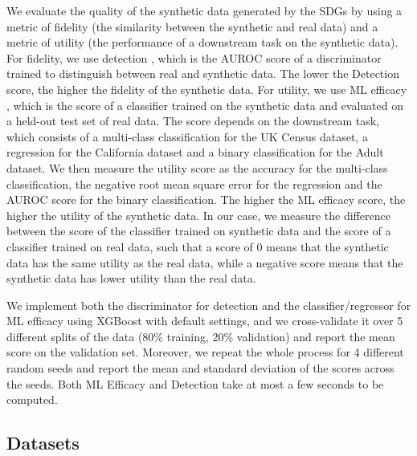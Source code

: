 We evaluate the quality of the synthetic data generated by the SDGs by using a metric of fidelity (the similarity between the synthetic and real data) and a metric of utility (the performance of a downstream task on the synthetic data).
For fidelity, we use detection \citep{snoke2018general}, which is the AUROC score of a discriminator trained to distinguish between real and synthetic data. The lower the Detection score, the higher the fidelity of the synthetic data.
For utility, we use ML efficacy \citep{park2018data}, which is the score of a classifier trained on the synthetic data and evaluated on a held-out test set of real data. The score depends on the downstream task, which consists of a multi-class classification for the UK Census dataset, a regression for the California dataset and a binary classification for the Adult dataset. We then measure the utility score as the accuracy for the multi-class classification, the negative root mean square error for the regression and the AUROC score for the binary classification. The higher the ML efficacy score, the higher the utility of the synthetic data.
In our case, we measure the difference between the score of the classifier trained on synthetic data and the score of a classifier trained on real data, such that a score of 0 means that the synthetic data has the same utility as the real data, while a negative score means that the synthetic data has lower utility than the real data.

We implement both the discriminator for detection and the classifier/regressor for ML efficacy using XGBoost \citep{chen2015xgboost} with default settings, and we cross-validate it over 5 different splits of the data (80\% training, 20\% validation) and report the mean score on the validation set.
Moreover, we repeat the whole process for 4 different random seeds and report the mean and standard deviation of the scores across the seeds.
Both ML Efficacy and Detection take at most a few seconds to be computed.

\subsection{Datasets}

